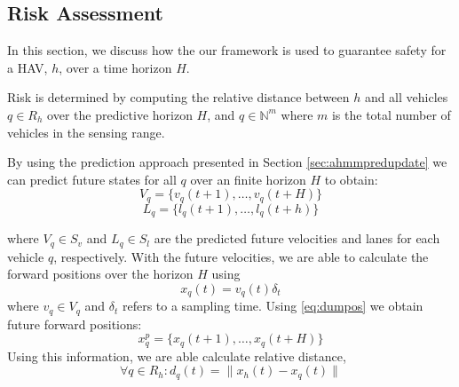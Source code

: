 \documentclass[letterpaper, 10 pt, conference]{ieeeconf}  %
\newcommand\NB[1]{$\spadesuit$\footnote{NB: #1}}
\newcommand\RP[1]{$\clubsuit$\footnote{RP: #1}}
\begin{document}
\subsection{Risk Assessment}

 In this section, we discuss how the our framework is used to guarantee safety for a HAV, $h$, over a time horizon $H$.
 
 
 Risk is determined by computing the relative distance between $h$ and all vehicles $q\in R_h$ over the predictive horizon $H$, and $q\in\mathbb{N}^m$ where $m$ is the total number of vehicles in the sensing range.


By using the prediction approach presented in Section \ref{sec:ahmmpredupdate} we can predict future states for all $q$ over an finite horizon $H$ to obtain:
\begin{equation}
    V_q = \{v_q(t+1),\ldots,v_q(t+H)\}
\end{equation}
\begin{equation}
    L_q = \{l_q(t+1),\ldots,l_q(t+h)\}
\end{equation}


where $V_q\in S_v$ and $L_q\in S_l$ are the predicted future velocities and lanes for each vehicle $q$, respectively.
With the future velocities, we are able to calculate the forward positions over the horizon $H$ using %
\begin{equation} \label{eq:dumpos}
    x_q(t) = v_q(t)\delta_t
\end{equation}
where $v_q\in V_q$ and $\delta_t$ refers to a sampling time. Using \eqref{eq:dumpos} we obtain future forward positions:
\begin{equation}
    x_q^p = \{x_q(t+1),\ldots,x_q(t+H)\}
\end{equation}
Using this information, we are able calculate relative distance,
\begin{equation}
    \forall q \in R_h: d_q(t) = \lVert x_h(t)-x_q(t)\rVert
\end{equation}
\end{document}
